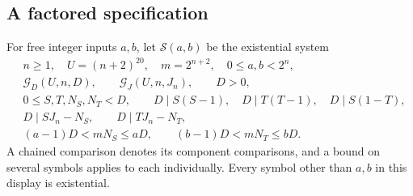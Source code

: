 \documentclass[11pt,letterpaper]{article}
\numberwithin{equation}{section}
\begin{document}
\subsection{A factored specification}
For free integer inputs $a,b$, let $\mathcal S(a,b)$ be the existential system
\begin{align}
 &n\ge1,\quad U=(n+2)^{20},\quad m=2^{n+2},\quad 0\le a,b<2^n,
       \label{eq:assembly-width}\\
 &\mathcal G_D(U,n,D),\qquad \mathcal G_J(U,n,J_n),\qquad D>0,
       \label{eq:assembly-words}\\
 &0\le S,T,N_S,N_T<D,\qquad
       D\mid S(S-1),\quad D\mid T(T-1),\quad D\mid S(1-T),
       \label{eq:assembly-order}\\
 &D\mid SJ_n-N_S,\qquad D\mid TJ_n-N_T,
       \label{eq:assembly-residue}\\
 &(a-1)D<mN_S\le aD,\qquad (b-1)D<mN_T\le bD .
       \label{eq:assembly-ceil}
\end{align}
A chained comparison denotes its component comparisons, and a bound on several symbols applies to each individually. Every symbol other than $a,b$ in this display is existential.
\end{document}
